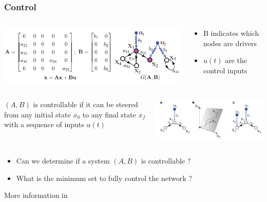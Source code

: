 \documentclass[xcolor=dvipsnames]{beamer}
\begin{document}
\begin{frame}
	\frametitle{Control}
	
	\begin{columns}
		\begin{column}{.6\textwidth}
			\includegraphics[scale=.55]{control}
		\end{column}
		\begin{column}{.4\textwidth}		
			\begin{itemize}
				\item B indicates which nodes are drivers
				\item $u(t)$ are the control inputs
			\end{itemize}
		\end{column}
	\end{columns}
	
	\begin{columns}
		\begin{column}{.5\textwidth}
			 $(A,B)$ is controllable if it can be steered from any initial state $ x_0 $ to any final state $ x_f $ with a sequence of inputs $u(t)$
		\end{column}
		\begin{column}{.5\textwidth}
			\includegraphics[scale=.55]{control2}
		\end{column}
	\end{columns}
	\begin{itemize}
		\item Can we determine if a system $(A,B)$ is controllable ?
		\item What is the minimum set to fully control the network ?
	\end{itemize}
	More information in 
\end{frame}
\end{document}
